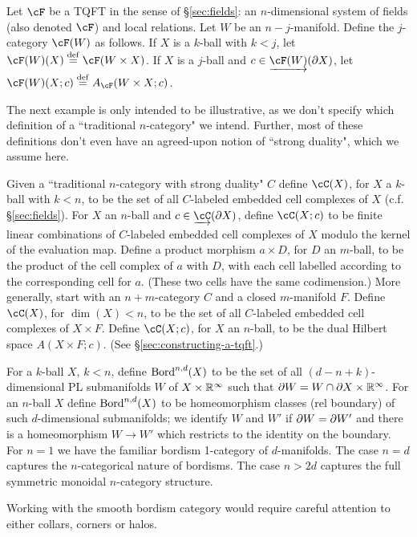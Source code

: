 \begin{example}
\rm
\label{ex:ncats-from-tqfts}%
Let $\cF$ be a TQFT in the sense of \S\ref{sec:fields}: an $n$-dimensional 
system of fields (also denoted $\cF$) and local relations.
Let $W$ be an $n{-}j$-manifold.
Define the $j$-category $\cF(W)$ as follows.
If $X$ is a $k$-ball with $k<j$, let $\cF(W)(X) \deq \cF(W\times X)$.
If $X$ is a $j$-ball and $c\in \cl{\cF(W)}(\bd X)$, 
let $\cF(W)(X; c) \deq A_\cF(W\times X; c)$.
\end{example}

The next example is only intended to be illustrative, as we don't specify 
which definition of a ``traditional $n$-category" we intend.
Further, most of these definitions don't even have an agreed-upon notion of 
``strong duality", which we assume here.
\begin{example}
\rm
\label{ex:traditional-n-categories}
Given a ``traditional $n$-category with strong duality" $C$
define $\cC(X)$, for $X$ a $k$-ball with $k < n$,
to be the set of all $C$-labeled embedded cell complexes of $X$ (c.f. \S \ref{sec:fields}).
For $X$ an $n$-ball and $c\in \cl{\cC}(\bd X)$, define $\cC(X; c)$ to be finite linear
combinations of $C$-labeled embedded cell complexes of $X$
modulo the kernel of the evaluation map.
Define a product morphism $a\times D$, for $D$ an $m$-ball, to be the product of the cell complex of $a$ with $D$,
with each cell labelled according to the corresponding cell for $a$.
(These two cells have the same codimension.)
More generally, start with an $n{+}m$-category $C$ and a closed $m$-manifold $F$.
Define $\cC(X)$, for $\dim(X) < n$,
to be the set of all $C$-labeled embedded cell complexes of $X\times F$.
Define $\cC(X; c)$, for $X$ an $n$-ball,
to be the dual Hilbert space $A(X\times F; c)$.
(See \S\ref{sec:constructing-a-tqft}.)
\end{example}


\begin{example}
\label{ex:bord-cat}
\rm
\label{ex:bordism-category}
For a $k$-ball $X$, $k<n$, define $\operatorname{Bord}^{n,d}(X)$ to be the set of all $(d{-}n{+}k)$-dimensional PL
submanifolds $W$ of $X\times \mathbb R^\infty$ such that $\partial W = W \cap \partial X \times \mathbb R^\infty$.
For an $n$-ball $X$ define $\operatorname{Bord}^{n,d}(X)$ to be homeomorphism classes (rel boundary) of such $d$-dimensional submanifolds;
we identify $W$ and $W'$ if $\partial W = \partial W'$ and there is a homeomorphism
$W \to W'$ which restricts to the identity on the boundary.
For $n=1$ we have the familiar bordism 1-category of $d$-manifolds.
The case $n=d$ captures the $n$-categorical nature of bordisms.
The case $n > 2d$ captures the full symmetric monoidal $n$-category structure.
\end{example}
\begin{rem}
Working with the smooth bordism category would require careful attention to either collars, corners or halos.
\end{rem}

